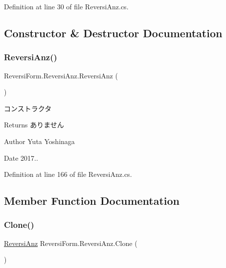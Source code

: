 Definition at line 30 of file Reversi\+Anz.\+cs.



\subsection{Constructor \& Destructor Documentation}
\mbox{\label{class_reversi_form_1_1_reversi_anz_ac5867f7647c016b8d674e450a23b8c4a}} 
\subsubsection{\texorpdfstring{Reversi\+Anz()}{ReversiAnz()}}
{\footnotesize\ttfamily Reversi\+Form.\+Reversi\+Anz.\+Reversi\+Anz (\begin{DoxyParamCaption}{ }\end{DoxyParamCaption})}



コンストラクタ 

\begin{DoxyReturn}{Returns}
ありません 
\end{DoxyReturn}
\begin{DoxyAuthor}{Author}
Yuta Yoshinaga 
\end{DoxyAuthor}
\begin{DoxyDate}{Date}
2017.. 
\end{DoxyDate}


Definition at line 166 of file Reversi\+Anz.\+cs.



\subsection{Member Function Documentation}
\mbox{\label{class_reversi_form_1_1_reversi_anz_a2d167a05fd48451f019ca95e603e0bcc}} 
\subsubsection{\texorpdfstring{Clone()}{Clone()}}
{\footnotesize\ttfamily \hyperlink{class_reversi_form_1_1_reversi_anz}{Reversi\+Anz} Reversi\+Form.\+Reversi\+Anz.\+Clone (\begin{DoxyParamCaption}{ }\end{DoxyParamCaption})}



